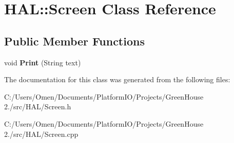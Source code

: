 \hypertarget{class_h_a_l_1_1_screen}{}\section{H\+AL\+:\+:Screen Class Reference}
\label{class_h_a_l_1_1_screen}
\subsection*{Public Member Functions}
\begin{DoxyCompactItemize}
\item 
\mbox{\label{class_h_a_l_1_1_screen_a57dead913e3f2def5d91306cce39027b}} 
void {\bfseries Print} (String text)
\end{DoxyCompactItemize}


The documentation for this class was generated from the following files\+:\begin{DoxyCompactItemize}
\item 
C\+:/\+Users/\+Omen/\+Documents/\+Platform\+I\+O/\+Projects/\+Green\+House 2./src/\+H\+A\+L/Screen.\+h\item 
C\+:/\+Users/\+Omen/\+Documents/\+Platform\+I\+O/\+Projects/\+Green\+House 2./src/\+H\+A\+L/Screen.\+cpp\end{DoxyCompactItemize}

